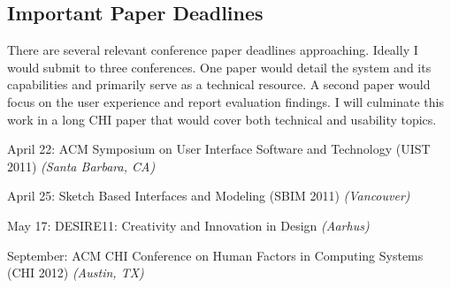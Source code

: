 \documentclass[12pt]{article}
\newenvironment{packed_enum}{
\begin{enumerate}
  \setlength{\itemsep}{1pt}
  \setlength{\parskip}{0pt}
  \setlength{\parsep}{0pt}
}{\end{enumerate}}
\begin{document}
\subsection{Important Paper Deadlines}
\label{sec:important-paper-deadlines}

There are several relevant conference paper deadlines
approaching. Ideally I would submit to three conferences. One paper
would detail the system and its capabilities and primarily serve as a
technical resource. A second paper would focus on the user experience
and report evaluation findings. I will culminate this work in a long
CHI paper that would cover both technical and usability topics.

\begin{packed_enum}

\item April 22: ACM Symposium on User Interface Software and
  Technology (UIST 2011) \textit{(Santa Barbara, CA)}

\item April 25: Sketch Based Interfaces and Modeling (SBIM 2011)
  \textit{(Vancouver)}

\item May 17: DESIRE11: Creativity and Innovation in Design
  \textit{(Aarhus)}

\item September: ACM CHI Conference on Human Factors in Computing
  Systems (CHI 2012) \textit{(Austin, TX)}

\end{packed_enum}
\singlespacing\newpage



\end{document}
